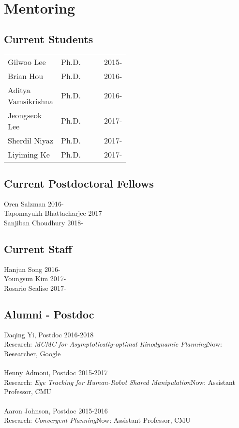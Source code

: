 

\section{Mentoring} 
\subsection{Current Students}
\vspace{-1em}
\begin{center}
\begin{tabular}{lrlp{0.5\linewidth}l}
Gilwoo Lee & Ph.D. &  & & 2015-\\
Brian Hou & Ph.D. & & & 2016-\\
Aditya Vamsikrishna & Ph.D. & & & 2016-\\
Jeongseok Lee & Ph.D. & & & 2017-\\
Sherdil Niyaz & Ph.D. & & & 2017-\\
Liyiming Ke & Ph.D. & & & 2017-\\
\end{tabular}
\end{center}

\subsection{Current Postdoctoral Fellows}
\vspace{-1em}
\noindent
Oren Salzman \hfill 2016-\\
Tapomayukh Bhattacharjee \hfill 2017-\\
Sanjiban Choudhury \hfill 2018-\\

\subsection{Current Staff}
\vspace{-1em}
\noindent
Hanjun Song \hfill 2016-\\
Youngsun Kim \hfill 2017-\\
Rosario Scalise \hfill 2017-\\

\subsection{Alumni - Postdoc}
\vspace{-1em}
\noindent
Daqing Yi, Postdoc \hfill 2016-2018\\
Research: \textit{MCMC for Asymptotically-optimal Kinodynamic Planning}\hfill Now: Researcher, Google\\
\\
Henny Admoni, Postdoc \hfill 2015-2017\\
Research: \textit{Eye Tracking for Human-Robot Shared Manipulation}\hfill Now: Assistant Professor, CMU\\
\\
Aaron Johnson, Postdoc \hfill 2015-2016\\
Research: \textit{Convergent Planning}\hfill Now: Assistant Professor, CMU\\

